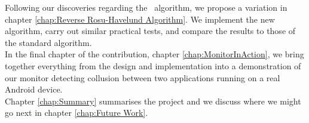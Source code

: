 \noindent Following our discoveries regarding the \RH\ algorithm, we propose a variation in chapter \ref{chap:Reverse Rosu-Havelund Algorithm}.  We implement the new algorithm, carry out similar practical tests, and compare the results to those of the standard algorithm.\\

\noindent In the final chapter of the contribution, chapter \ref{chap:MonitorInAction}, we bring together everything from the design and implementation into a demonstration of our monitor detecting collusion between two applications running on a real Android device.\\

\noindent Chapter \ref{chap:Summary} summarises the project and we discuss where we might go next in chapter \ref{chap:Future Work}.

